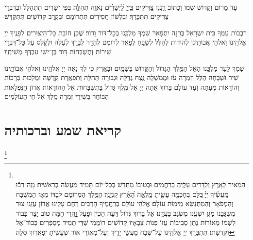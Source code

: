 \documentclass[twoside, openany, parskip=half, 11pt]{book}
\begin{document}
\\
עַד מָרוֹם וְקָדוֹשׁ שְׁמוֹ וְכָתוּב׃ רַֽנֲנ֣וּ צַ֭דִּיקִים בַּֽיְיָ֑ לַ֝יְשָׁרִ֗ים נָאוָ֥ה תְהִלָּֽה׃ בְּפִי יְשָׁרִים תִּתְהַלָּל׃ וּבְדִבְרֵי צַדִּיקִים תִּתְבָּרַךְ׃ וּבִלְשׁוֹן חֲסִידִים תִּתְרוֹמָם׃ וּבְקֶֽרֶב קְדוֹשִׁים תִּתְקַדָּשׁ׃

רִבְבוֹת עַמְּךָ בֵּית יִשְׂרָאֵל בְּרִנָּה יִתְפָּאַר שִׁמְךָ מַלְכֵּֽנוּ בְּכׇל־דּוֹר וָדוֹר׃ שֶׁכֵּן חוֹבַת כׇּל־הַיְצוּרִים לְפָנֶֽיךָ יְיָ אֱלֹהֵֽינוּ וֵאלֹהֵי אֲבוֹתֵֽינוּ לְהוֹדוֹת לְהַלֵּל לְשַׁבֵּֽחַ לְפָאֵר לְרוֹמֵם לְהַדֵּר לְבָרֵךְ לְעַלֵּה וּלְקַלֵּס עַל כׇּל־דִּבְרֵי שִׁירוֹת וְתֻשְׁבְּחוֹת דָּוִד בֶּן־יִשַׁי עַבְדְּךָ מְשִׁיחֶֽךָ׃


שִׁמְךָ לָעַד מַלְכֵּֽנוּ הָאֵל הַמֶּֽלֶךְ הַגָּדוֹל וְהַקָּדוֹשׁ בַּשָׁמַֽיִם וּבָאָֽרֶץ כִּי לְךָ נָאֶה יְיָ אֱלֹהֵֽינוּ וֵאלֹהֵי אֲבוֹתֵֽינוּ שִׁיר וּשְׁבָחָה הַלֵּל וְזִמְרָה עֹז וּמֶמְשָׁלָה נֶֽצַח גְּדֻלָּה וּגְבוּרָה תְּהִלָּה וְתִפְאֶֽרֶת קְדֻשָּׁה וּמַלְכוּת בְּרָכוֹת וְהוֹדָאוֹת מֵעַתָּה וְעַד עוֹלָם׃
בָּרוּךְ אַתָּה יְיָ אֵל מֶֽלֶךְ גָּדוֹל בַּתֻּשְׁבָּחוֹת אֵל הַהוֹדָאוֹת אֲדוֹן הַנִּפְלָאוֹת הַבּוֹחֵר בְּשִׁירֵי זִמְרָה מֶֽלֶךְ אֵל חֵי הָעוֹלָמִים׃
\mimaamakim
\halfkaddish

\section[קריאת שמע וברכותיה]{ קריאת שמע וברכותיה }

\barachu


\footnote{\\
הַמֵּאִיר לָאָֽרֶץ וְלַדָּרִים עָלֶֽיהָ בְּרַחֲמִים וּבְטוּבוֹ מְחַדֵּשׁ בְּכׇל־יוֹם תָּמִיד מַעֲשֵׂה בְרֵאשִׁית׃
מָֽה־רַבּ֬וּ מַֽעֲשֶׂ֨יךָ יְיָ֗ ֖כֻּלָּם בְּחָכְמָ֣ה עָשִׂ֑יתָ מָֽלְאָ֥ה הָ֝אָ֗רֶץ קִנְיָנֶֽךָ׃ הַמֶּֽלֶךְ הַמְרוֹמָם לְבַדּוֹ מֵאָז הַמְשֻׁבָּח וְהַמְפֹאָר וְהַמִּתְנַשֵּׂא מִימוֹת עוֹלָם׃ אֱלֹהֵי עוֹלָם בְּרַחֲמֶיךָ הָרַבִּים רַחֵם עָלֵינוּ אֲדוֹן עֻזֵּֽנוּ צוּר מִשְׂגַּבֵּנוּ מָגֵן יִשְׁעֵֽנוּ מִשְׂגָּב בַּעֲדֵֽנוּ׃ אֵל בָּרוּךְ גְּדוֹל דֵּעָה הֵכִין וּפָעַל זׇׇׇׇהֳרֵי חַמָּה טוֹב יָצַר כָּבוֹד לִשְׁמוֹ מְאוֹרוֹת נָתַן סְבִיבוֹת עֻזּוֹ פִּנּוֹת צְבָאָיו קְדוֹשִׁים רוֹמֲמֵי שַׁדַּי תָּמִיד מְסַפְּרִים כְּבוֹד־אֵל וּקְדֻשָׁתוֹ׃ תִּתְבָּרַךְ יְיָ אֱלֹהֵֽינוּ עַל־שֶׁבַח מַעֲשֵׂי יָדֶֽיךָ וְעַל־מְאֽוֹרֵי אוֹר שֶׁעָשִֽׂיתָ יְפָאֲרֽוּךָ סֶּֽלָה׃
}
\end{document}
